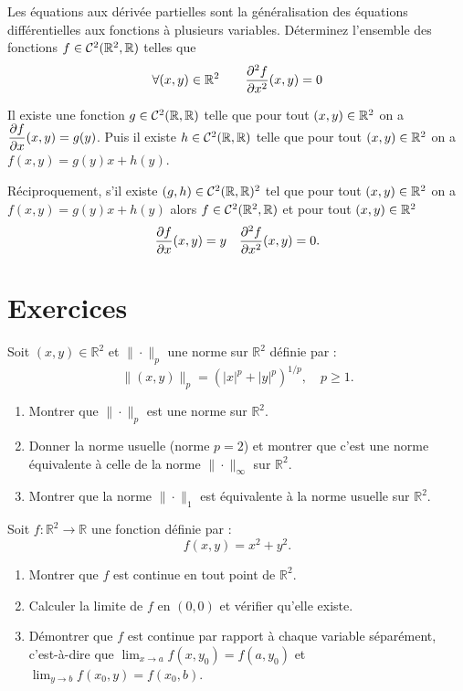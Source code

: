 Les équations aux dérivée partielles sont la généralisation des 
équations différentielles aux fonctions à plusieurs variables. Déterminez 
l'ensemble des fonctions \(f \in \mathcal{C}^{2}(\mathbb{R}^2, \mathbb{R})\) telles que
\begin{equation}
  \forall (x,y) \in \mathbb{R}^2 \qquad \dfrac{\partial{}^2 f}{\partial{} {x}^2}(x, y) = 0
\end{equation}

Il existe une fonction \(g \in \mathcal{C}^{2}(\mathbb{R}, \mathbb{R})\) telle que pour tout 
\((x, y) \in \mathbb{R}^2\) on a \(\dfrac{\partial{} f}{\partial{} x}(x, y)=g(y)\). Puis il existe 
\(h \in  \mathcal{C}^{2}(\mathbb{R}, \mathbb{R})\) telle que pour tout \((x, y) \in \mathbb{R}^2\) on 
a \(f(x, y) = g(y)x+h(y)\).

Réciproquement, s'il existe \((g, h) \in \mathcal{C}^{2}(\mathbb{R}, \mathbb{R})^2\) tel que 
pour tout \((x, y) \in \mathbb{R}^2\) on a \(f(x, y) = g(y)x+h(y)\) alors \(f 
\in \mathcal{C}^{2}(\mathbb{R}^2, \mathbb{R})\) et pour tout \((x, y) \in \mathbb{R}^2\)
\begin{equation}
  \dfrac{\partial{} f}{\partial{} x}(x,y)=y \quad   \dfrac{\partial{}^2 f}{\partial{} {x}^2}(x,y)=0.
\end{equation}
\section{Exercices}
\begin{exercice}
Soit \( (x, y) \in \mathbb{R}^2 \) et \( \| \cdot \|_p \) une norme sur \( \mathbb{R}^2 \) définie par :
\[
\| (x, y) \|_p = (|x|^p + |y|^p)^{1/p}, \quad p \geq 1.
\]
\begin{enumerate}
    \item Montrer que \( \| \cdot \|_p \) est une norme sur \( \mathbb{R}^2 \).
    \item Donner la norme usuelle (norme \( p = 2 \)) et montrer que c'est une norme équivalente à celle de la norme \( \| \cdot \|_\infty \) sur \( \mathbb{R}^2 \).
    \item Montrer que la norme \( \| \cdot \|_1 \) est équivalente à la norme usuelle sur \( \mathbb{R}^2 \).
\end{enumerate}
\end{exercice}

\begin{exercice}
Soit \( f : \mathbb{R}^2 \to \mathbb{R} \) une fonction définie par :
\[
f(x, y) = x^2 + y^2.
\]
\begin{enumerate}
    \item Montrer que \( f \) est continue en tout point de \( \mathbb{R}^2 \).
    \item Calculer la limite de \( f \) en \( (0, 0) \) et vérifier qu'elle existe.
    \item Démontrer que \( f \) est continue par rapport à chaque variable séparément, c'est-à-dire que \( \lim_{x \to a} f(x, y_0) = f(a, y_0) \) et \( \lim_{y \to b} f(x_0, y) = f(x_0, b) \).
\end{enumerate}
\end{exercice}


